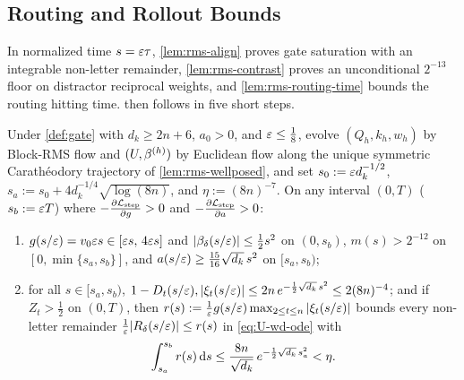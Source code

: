 \subsection{Routing and Rollout Bounds}
\label{app:rms-struct-sub}
\label{app:rms-routing-sub}

In normalized time $s = \varepsilon\tau$, \cref{lem:rms-align} proves gate saturation with an integrable non-letter remainder, \cref{lem:rms-contrast} proves an unconditional $2^{-13}$ floor on distractor reciprocal weights, and \cref{lem:rms-routing-time} bounds the routing hitting time.  then follows in five short steps.

\begin{lemma}
\label{lem:rms-align}
Under \cref{def:gate} with $d_k \ge 2n + 6$, $a_0 > 0$, and $\varepsilon \le \frac{1}{8}$, evolve $(Q_h, k_h, w_h)$ by Block-RMS flow and $(U, \beta^{(h)})$ by Euclidean flow along the unique symmetric Carath\'eodory trajectory of \cref{lem:rms-wellposed}, and set $s_0 := \varepsilon d_k^{-1/2}$, $s_a := s_0 + 4 d_k^{-1/4}\sqrt{\log(8n)}$, and $\eta := (8n)^{-7}$. On any interval $(0, T)$ ($s_b := \varepsilon T$) where $-\pd{\Lstep}{g} > 0$ and $-\pd{\Lstep}{a} > 0$:
\begin{enumerate}[label=(\roman*),leftmargin=*,itemsep=1pt,topsep=2pt]
\item $g(s/\varepsilon) = v_0\varepsilon s \in [\varepsilon s,\, 4\varepsilon s]$ and $|\beta_\delta(s/\varepsilon)| \le \frac{1}{2}s^2$ on $(0, s_b)$, $m(s) > 2^{-12}$ on $[0, \min\{s_a, s_b\}]$, and $a(s/\varepsilon) \ge \frac{15}{16}\sqrt{d_k}\,s^2$ on $[s_a, s_b)$;
\item for all $s \in [s_a, s_b)$, $1 - D_t(s/\varepsilon), |\xi_t(s/\varepsilon)| \le 2n\,e^{-\frac{1}{2}\sqrt{d_k}\,s^2} \le 2(8n)^{-4}$; and if $Z_t > \frac{1}{2}$ on $(0, T)$, then $r(s) := \frac{1}{\varepsilon}g(s/\varepsilon)\max_{2\le t\le n}|\xi_t(s/\varepsilon)|$ bounds every non-letter remainder $\frac{1}{\varepsilon}|R_\delta(s/\varepsilon)| \le r(s)$ in \cref{eq:U-wd-ode} with
\[
  \int_{s_a}^{s_b} r(s)\,\mathrm{d} s \le \frac{8n}{\sqrt{d_k}}\,e^{-\frac{1}{2}\sqrt{d_k}\,s_a^2} < \eta.
\]
\end{enumerate}
\end{lemma}

